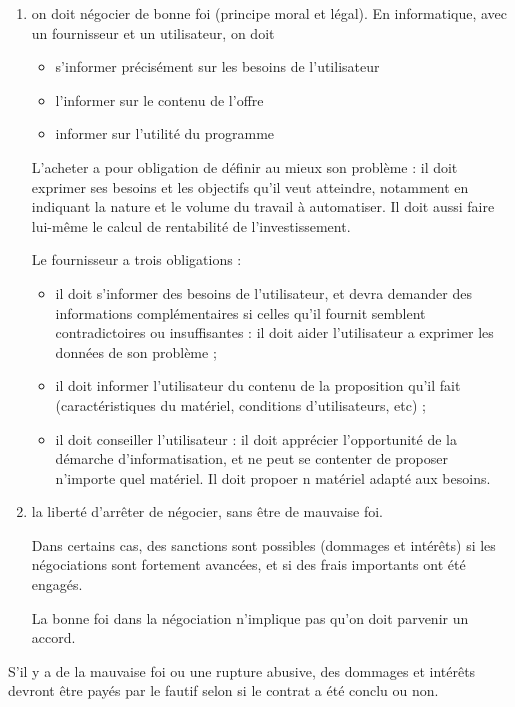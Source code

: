 		\begin{enumerate}	
			\item on doit négocier de bonne foi (principe moral et légal). En informatique, avec un fournisseur et un utilisateur, on doit
			
			\begin{itemize}
				\item s'informer précisément sur les besoins de l'utilisateur
				\item l'informer sur le contenu de l'offre
				\item informer sur l'utilité du programme
			\end{itemize}	

		
			L'acheter a pour obligation de définir au mieux son problème : il doit exprimer ses besoins et les objectifs qu'il veut atteindre, notamment en indiquant la nature et le volume du travail à automatiser. Il doit aussi faire lui-même le calcul de rentabilité de l'investissement.
		
			Le fournisseur a trois obligations :
		
			\begin{itemize}
				\item il doit s'informer des besoins de l'utilisateur, et devra demander des informations complémentaires si celles qu'il fournit semblent contradictoires ou insuffisantes : il doit aider l'utilisateur a exprimer les données de son problème ;
				\item il doit informer l'utilisateur du contenu de la proposition qu'il fait (caractéristiques du matériel, conditions d'utilisateurs, etc) ;
				\item il doit conseiller l'utilisateur : il doit apprécier l'opportunité de la démarche d'informatisation, et ne peut se contenter de proposer n'importe quel matériel. Il doit propoer n matériel adapté aux besoins.
			\end{itemize}
		
			\item la liberté d'arrêter de négocier, sans être de mauvaise foi. 
			
			Dans certains cas, des sanctions sont possibles (dommages et intérêts) si les négociations sont fortement avancées, et si des frais importants ont été engagés.
			
			La bonne foi dans la négociation n'implique pas qu'on doit parvenir un accord.
		\end{enumerate}		
		
		S'il y a de la mauvaise foi ou une rupture abusive, des dommages et intérêts devront être payés par le fautif selon si le contrat a été conclu ou non.
		
